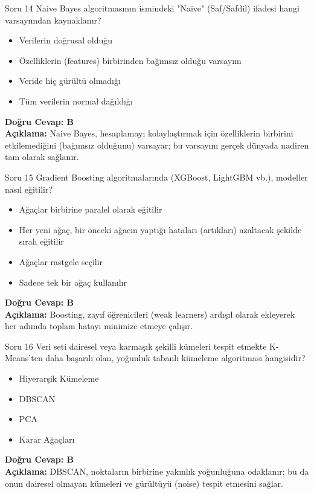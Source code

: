 \documentclass[12pt,a4paper]{article}
\begin{document}
\begin{testcard}{Soru 14}
    Naive Bayes algoritmasının ismindeki "Naive" (Saf/Safdil) ifadesi hangi varsayımdan kaynaklanır?
    \begin{itemize}
        \item[A)] Verilerin doğrusal olduğu
        \item[B)] Özelliklerin (features) birbirinden bağımsız olduğu varsayım
        \item[C)] Veride hiç gürültü olmadığı
        \item[D)] Tüm verilerin normal dağıldığı
    \end{itemize}
    \tcblower
    \textbf{Doğru Cevap: B} \\
    \textbf{Açıklama:} Naive Bayes, hesaplamayı kolaylaştırmak için özelliklerin birbirini etkilemediğini (bağımsız olduğunu) varsayar; bu varsayım gerçek dünyada nadiren tam olarak sağlanır.
\end{testcard}

\begin{testcard}{Soru 15}
    Gradient Boosting algoritmalarında (XGBoost, LightGBM vb.), modeller nasıl eğitilir?
    \begin{itemize}
        \item[A)] Ağaçlar birbirine paralel olarak eğitilir
        \item[B)] Her yeni ağaç, bir önceki ağacın yaptığı hataları (artıkları) azaltacak şekilde sıralı eğitilir
        \item[C)] Ağaçlar rastgele seçilir
        \item[D)] Sadece tek bir ağaç kullanılır
    \end{itemize}
    \tcblower
    \textbf{Doğru Cevap: B} \\
    \textbf{Açıklama:} Boosting, zayıf öğrenicileri (weak learners) ardışıl olarak ekleyerek her adımda toplam hatayı minimize etmeye çalışır.
\end{testcard}

\begin{testcard}{Soru 16}
    Veri seti dairesel veya karmaşık şekilli kümeleri tespit etmekte K-Means'ten daha başarılı olan, yoğunluk tabanlı kümeleme algoritması hangisidir?
    \begin{itemize}
        \item[A)] Hiyerarşik Kümeleme
        \item[B)] DBSCAN
        \item[C)] PCA
        \item[D)] Karar Ağaçları
    \end{itemize}
    \tcblower
    \textbf{Doğru Cevap: B} \\
    \textbf{Açıklama:} DBSCAN, noktaların birbirine yakınlık yoğunluğuna odaklanır; bu da onun dairesel olmayan kümeleri ve gürültüyü (noise) tespit etmesini sağlar.
\end{testcard}
\end{document}
